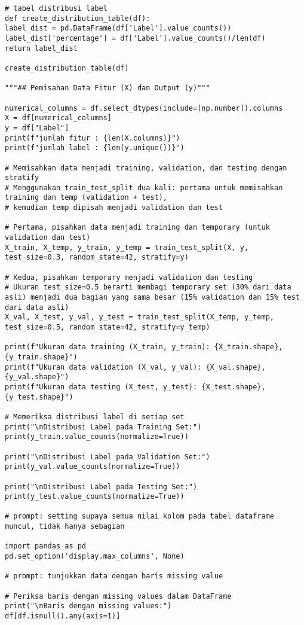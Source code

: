 \documentclass[a4paper,12pt]{report}
\begin{document}
\begin{lstlisting}
# tabel distribusi label
def create_distribution_table(df):
label_dist = pd.DataFrame(df['Label'].value_counts())
label_dist['percentage'] = df['Label'].value_counts()/len(df)
return label_dist

create_distribution_table(df)

"""## Pemisahan Data Fitur (X) dan Output (y)"""

numerical_columns = df.select_dtypes(include=[np.number]).columns
X = df[numerical_columns]
y = df["Label"]
print(f"jumlah fitur : {len(X.columns)}")
print(f"jumlah label : {len(y.unique())}")

# Memisahkan data menjadi training, validation, dan testing dengan stratify
# Menggunakan train_test_split dua kali: pertama untuk memisahkan training dan temp (validation + test),
# kemudian temp dipisah menjadi validation dan test

# Pertama, pisahkan data menjadi training dan temporary (untuk validation dan test)
X_train, X_temp, y_train, y_temp = train_test_split(X, y, test_size=0.3, random_state=42, stratify=y)

# Kedua, pisahkan temporary menjadi validation dan testing
# Ukuran test_size=0.5 berarti membagi temporary set (30% dari data asli) menjadi dua bagian yang sama besar (15% validation dan 15% test dari data asli)
X_val, X_test, y_val, y_test = train_test_split(X_temp, y_temp, test_size=0.5, random_state=42, stratify=y_temp)

print(f"Ukuran data training (X_train, y_train): {X_train.shape}, {y_train.shape}")
print(f"Ukuran data validation (X_val, y_val): {X_val.shape}, {y_val.shape}")
print(f"Ukuran data testing (X_test, y_test): {X_test.shape}, {y_test.shape}")

# Memeriksa distribusi label di setiap set
print("\nDistribusi Label pada Training Set:")
print(y_train.value_counts(normalize=True))

print("\nDistribusi Label pada Validation Set:")
print(y_val.value_counts(normalize=True))

print("\nDistribusi Label pada Testing Set:")
print(y_test.value_counts(normalize=True))

# prompt: setting supaya semua nilai kolom pada tabel dataframe muncul, tidak hanya sebagian

import pandas as pd
pd.set_option('display.max_columns', None)

# prompt: tunjukkan data dengan baris missing value

# Periksa baris dengan missing values dalam DataFrame
print("\nBaris dengan missing values:")
df[df.isnull().any(axis=1)]


\end{lstlisting}
\end{document}
